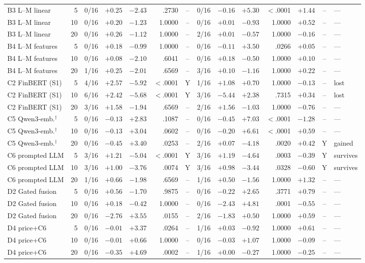 \begin{table}[p]
\begin{tabular}{@{}lrrrrrcrrrrrcl@{}}
B3 L--M linear&5&0/16&$+0.25$&$-2.43$& .2730 &--&0/16&$-0.16$&$+5.30$& $<$.0001 &$+1.44$&--&---\\
B3 L--M linear&10&0/16&$+0.20$&$-1.23$& 1.0000 &--&0/16&$+0.01$&$-0.93$& 1.0000 &$+0.52$&--&---\\
B3 L--M linear&20&0/16&$+0.26$&$-1.12$& 1.0000 &--&2/16&$+0.01$&$-0.57$& 1.0000 &$-0.16$&--&---\\
\addlinespace
B4 L--M features&5&0/16&$+0.18$&$-0.99$& 1.0000 &--&0/16&$-0.11$&$+3.50$& .0266 &$+0.05$&--&---\\
B4 L--M features&10&0/16&$+0.08$&$-2.10$& .6041 &--&0/16&$+0.18$&$-0.50$& 1.0000 &$+0.10$&--&---\\
B4 L--M features&20&1/16&$+0.25$&$-2.01$& .6569 &--&3/16&$+0.10$&$-1.16$& 1.0000 &$+0.22$&--&---\\
\addlinespace
C2 FinBERT (S1)&5&4/16&$+2.57$&$-5.92$& $<$.0001 &Y&1/16&$+1.08$&$+0.70$& 1.0000 &$-0.13$&--&lost\\
C2 FinBERT (S1)&10&6/16&$+2.42$&$-5.68$& $<$.0001 &Y&3/16&$-5.44$&$+2.38$& .7315 &$+0.34$&--&lost\\
C2 FinBERT (S1)&20&3/16&$+1.58$&$-1.94$& .6569 &--&2/16&$+1.56$&$-1.03$& 1.0000 &$-0.76$&--&---\\
\addlinespace
C5 Qwen3-emb.$^{\dagger}$&5&0/16&$-0.13$&$+2.83$& .1087 &--&0/16&$-0.45$&$+7.03$& $<$.0001 &$-1.28$&--&---\\
C5 Qwen3-emb.$^{\dagger}$&10&0/16&$-0.13$&$+3.04$& .0602 &--&0/16&$-0.20$&$+6.61$& $<$.0001 &$+0.59$&--&---\\
C5 Qwen3-emb.$^{\dagger}$&20&0/16&$-0.45$&$+3.40$& .0253 &--&2/16&$+0.07$&$-4.18$& .0020 &$+0.42$&Y&gained\\
\addlinespace
C6 prompted LLM&5&3/16&$+1.21$&$-5.04$& $<$.0001 &Y&3/16&$+1.19$&$-4.64$& .0003 &$-0.39$&Y&survives\\
C6 prompted LLM&10&3/16&$+1.00$&$-3.76$& .0074 &Y&3/16&$+0.98$&$-3.44$& .0328 &$-0.60$&Y&survives\\
C6 prompted LLM&20&1/16&$+0.66$&$-1.98$& .6569 &--&1/16&$+0.50$&$-1.56$& 1.0000 &$+1.32$&--&---\\
\addlinespace
D2 Gated fusion&5&0/16&$+0.56$&$-1.70$& .9875 &--&0/16&$-0.22$&$+2.65$& .3771 &$+0.79$&--&---\\
D2 Gated fusion&10&0/16&$+0.18$&$-0.42$& 1.0000 &--&0/16&$-2.43$&$+4.81$& .0001 &$-0.55$&--&---\\
D2 Gated fusion&20&0/16&$-2.76$&$+3.55$& .0155 &--&2/16&$-1.83$&$+0.50$& 1.0000 &$+0.59$&--&---\\
\addlinespace
D4 price+C6&5&0/16&$-0.01$&$+3.37$& .0264 &--&1/16&$+0.03$&$-0.92$& 1.0000 &$+0.61$&--&---\\
D4 price+C6&10&0/16&$-0.01$&$+0.66$& 1.0000 &--&0/16&$-0.03$&$+1.07$& 1.0000 &$-0.09$&--&---\\
D4 price+C6&20&0/16&$-0.35$&$+4.69$& .0002 &--&1/16&$+0.00$&$-0.27$& 1.0000 &$-0.25$&--&---\\
\bottomrule
\end{tabular}
\end{table}


